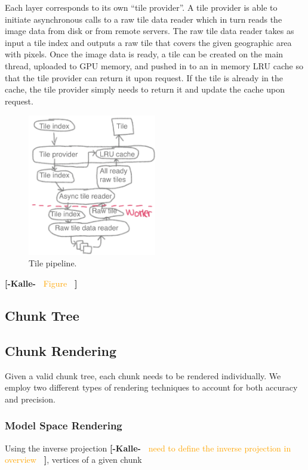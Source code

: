 \documentclass[journal]{vgtc}                %
\newcommand{\kallecomment}[1]{\textbf{[-Kalle-~}
    \textcolor{orange}{#1}
    \textbf{~]}}
\begin{document}
Each layer corresponds to its own ``tile provider''.
A tile provider is able to initiate asynchronous calls to a raw tile data reader which in turn reads the image data from disk or from remote servers.
The raw tile data reader takes as input a tile index and outputs a raw tile that covers the given geographic area with pixels.
Once the image data is ready, a tile can be created on the main thread, uploaded to GPU memory, and pushed in to an in memory LRU cache so that the tile provider can return it upon request.
If the tile is already in the cache, the tile provider simply needs to return it and update the cache upon request.

\begin{figure}[h]
  \centering
    \includegraphics[width=0.5\textwidth]{figures/tile_pipeline.png}
  \caption{Tile pipeline.}
\end{figure}

\kallecomment{Figure}

\subsection{Chunk Tree}



\subsection{Chunk Rendering}

Given a valid chunk tree, each chunk needs to be rendered individually.
We employ two different types of rendering techniques to account for both accuracy and precision.
\subsubsection{Model Space Rendering}
Using the inverse projection \kallecomment{need to define the inverse projection in overview}, vertices of a given chunk 
\end{document}
